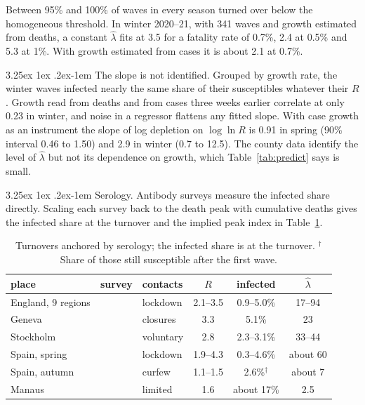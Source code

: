 \documentclass[11pt]{article}
\makeatletter
\renewcommand\paragraph{\@startsection{paragraph}{4}{\z@}%
  {3.25ex \@plus1ex \@minus.2ex}{-1em}%
  {\normalfont\normalsize\itshape}}
\theoremstyle{remark}
\makeatother
\begin{document}
Between 95\% and 100\% of waves in every season turned over below the homogeneous threshold. In winter 2020--21,
with 341 waves and growth estimated from deaths, a constant $\hat\lambda$ fits at 3.5 for a fatality rate of 0.7\%,
2.4 at 0.5\% and 5.3 at 1\%. With growth estimated from cases it is about 2.1 at 0.7\%.

\paragraph{The slope is not identified.} Grouped by growth rate, the winter waves infected nearly the same share of
their susceptibles whatever their $R$. Growth read from deaths and from cases three weeks earlier correlate at only
0.23 in winter, and noise in a regressor flattens any fitted slope. With case growth as an instrument the slope of
log depletion on $\log\ln R$ is 0.91 in spring (90\% interval 0.46 to 1.50) and 2.9 in winter (0.7 to 12.5). The
county data identify the level of $\hat\lambda$ but not its dependence on growth, which Table~\ref{tab:predict} says
is small.

\paragraph{Serology.} Antibody surveys measure the infected share directly. Scaling each survey back to the death peak
with cumulative deaths gives the infected share at the turnover and the implied peak index in Table~\ref{tab:sero}.

\begin{table}[h]
\centering
\small
\begin{tabular}{lllccc}
\toprule
place & survey & contacts & $R$ & infected & $\hat\lambda$ \\
\midrule
England, 9 regions & \citet{ward2021} & lockdown & 2.1--3.5 & 0.9--5.0\% & 17--94 \\
Geneva & \citet{stringhini2020} & closures & 3.3 & 5.1\% & 23 \\
Stockholm & \citet{castrodopico2021} & voluntary & 2.8 & 2.3--3.1\% & 33--44 \\
Spain, spring & \citet{pollan2020} & lockdown & 1.9--4.3 & 0.3--4.6\% & about 60 \\
Spain, autumn & \citet{sanidad2020} & curfew & 1.1--1.5 & 2.6\%$^\dagger$ & about 7 \\
Manaus & \citet{buss2021} & limited & 1.6 & about 17\% & 2.5 \\
\bottomrule
\end{tabular}
\caption{Turnovers anchored by serology; the infected share is at the turnover. $^\dagger$Share of those still susceptible after the first wave.}\label{tab:sero}
\end{table}
\end{document}
